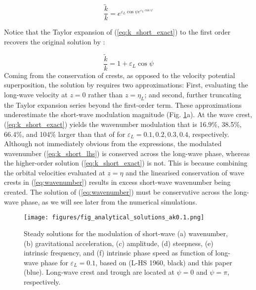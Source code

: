 \documentclass[lineno]{jfm}
\begin{document}
\begin{equation}
\label{eq:k_short_exact}
\frac{\widetilde{k}}{k} = e^{\varepsilon_L \cos{\psi} e^{\varepsilon_L \cos{\psi}}}
\end{equation}

Notice that the Taylor expansion of (\ref{eq:k_short_exact}) to the first order
recovers the original solution by \citet{longuet1960changes}:

\begin{equation}
\label{eq:k_short_lhs}
\frac{\widetilde{k}}{k} = 1 + \varepsilon_L \cos{\psi}
\end{equation}
Coming from the conservation of crests, as opposed to the velocity potential
superposition, the solution by \citet{longuet1960changes} requires two
approximations:
First, evaluating the long-wave velocity at $z = 0$ rather than $z = \eta_L$; and
second, further truncating the Taylor expansion series beyond the first-order
term.
These approximations underestimate the short-wave modulation magnitude
(Fig. \ref{fig:analytical_solutions_ak0.1}a).
At the wave crest, (\ref{eq:k_short_exact}) yields the wavenumber modulation
that is 16.9\%, 38.5\%, 66.4\%, and 104\% larger than that of
\citet{longuet1960changes} for $\varepsilon_L = 0.1, 0.2, 0.3, 0.4$, respectively.
Although not immediately obvious from the expressions, the modulated wavenumber
(\ref{eq:k_short_lhs}) is conserved across the long-wave phase, whereas
the higher-order solution (\ref{eq:k_short_exact}) is not.
This is because combining the orbital velocities evaluated at $z=\eta$ and the
linearised conservation of wave crests in (\ref{eq:wavenumber}) results in
excess short-wave wavenumber being created.
The solution of (\ref{eq:wavenumber}) must be conservative across the long-wave
phase, as we will see later from the numerical simulations.

\begin{figure}
\centering
\texttt{[image: figures/fig\_analytical\_solutions\_ak0.1.png]}
\caption{
  Steady solutions for the modulation of short-wave (a) wavenumber, (b)
  gravitational acceleration, (c) amplitude, (d) steepness, (e) intrinsic
  frequency, and (f) intrinsic phase speed as function of long-wave phase for
  $\varepsilon_L = 0.1$, based on
  \citet{longuet1960changes} (L-HS 1960, black) and this paper (blue).
  Long-wave crest and trough are located at $\psi = 0$ and $\psi = \pi$,
  respectively.
}
\label{fig:analytical_solutions_ak0.1}
\end{figure}
\end{document}
